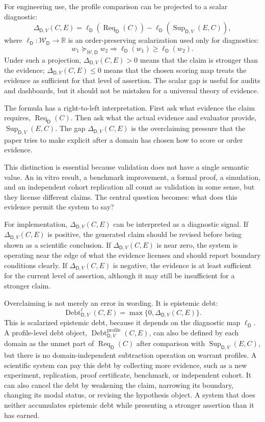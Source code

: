 \documentclass[11pt,a4paper]{article}
\newcommand{\Req}{\operatorname{Req}}
\newcommand{\Sup}{\operatorname{Sup}}
\newcommand{\Debt}{\operatorname{Debt}}
\newcommand{\Dom}{\mathsf{D}}
\begin{document}
For engineering use, the profile comparison can be projected to a scalar diagnostic:
\begin{equation}
\Delta_{\Dom,V}(C,E)=\ell_{\Dom}(\Req_{\Dom}(C))-\ell_{\Dom}(\Sup_{\Dom,V}(E,C)),
\end{equation}
where $\ell_{\Dom}:\mathcal{W}_{\Dom}\rightarrow\mathbb{R}$ is an order-preserving scalarization used only for diagnostics:
\[
w_1\succeq_{\mathcal{W},\Dom}w_2
\Rightarrow
\ell_{\Dom}(w_1)\geq \ell_{\Dom}(w_2).
\]
Under such a projection, $\Delta_{\Dom,V}(C,E)>0$ means that the claim is stronger than the evidence; $\Delta_{\Dom,V}(C,E)\leq 0$ means that the chosen scoring map treats the evidence as sufficient for that level of assertion. The scalar gap is useful for audits and dashboards, but it should not be mistaken for a universal theory of evidence.

The formula has a right-to-left interpretation. First ask what evidence the claim requires, $\Req_{\Dom}(C)$. Then ask what the actual evidence and evaluator provide, $\Sup_{\Dom,V}(E,C)$. The gap $\Delta_{\Dom,V}(C,E)$ is the overclaiming pressure that the paper tries to make explicit after a domain has chosen how to score or order evidence.

This distinction is essential because validation does not have a single semantic value. An in vitro result, a benchmark improvement, a formal proof, a simulation, and an independent cohort replication all count as validation in some sense, but they license different claims. The central question becomes: what does this evidence permit the system to say?

For implementation, $\Delta_{\Dom,V}(C,E)$ can be interpreted as a diagnostic signal. If $\Delta_{\Dom,V}(C,E)$ is positive, the generated claim should be revised before being shown as a scientific conclusion. If $\Delta_{\Dom,V}(C,E)$ is near zero, the system is operating near the edge of what the evidence licenses and should report boundary conditions clearly. If $\Delta_{\Dom,V}(C,E)$ is negative, the evidence is at least sufficient for the current level of assertion, although it may still be insufficient for a stronger claim.

Overclaiming is not merely an error in wording. It is epistemic debt:
\begin{equation}
\Debt^\ell_{\Dom,V}(C,E)=\max\{0,\Delta_{\Dom,V}(C,E)\}.
\end{equation}
This is scalarized epistemic debt, because it depends on the diagnostic map $\ell_{\Dom}$. A profile-level debt object, $\Debt^{\mathrm{profile}}_{\Dom,V}(C,E)$, can also be defined by each domain as the unmet part of $\Req_{\Dom}(C)$ after comparison with $\Sup_{\Dom,V}(E,C)$, but there is no domain-independent subtraction operation on warrant profiles. A scientific system can pay this debt by collecting more evidence, such as a new experiment, replication, proof certificate, benchmark, or independent cohort. It can also cancel the debt by weakening the claim, narrowing its boundary, changing its modal status, or revising the hypothesis object. A system that does neither accumulates epistemic debt while presenting a stronger assertion than it has earned.
\end{document}
